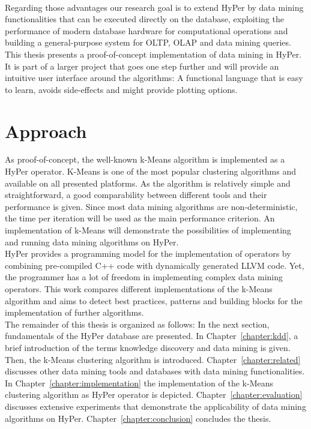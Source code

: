 \\
Regarding those advantages our research goal is to extend HyPer by data mining functionalities that can be executed directly on the database, exploiting the performance of modern database hardware for computational operations and building a general-purpose system for OLTP, OLAP and data mining queries. This thesis presents a proof-of-concept implementation of data mining in HyPer. It is part of a larger project that goes one step further and will provide an intuitive user interface around the algorithms: A functional language that is easy to learn, avoids side-effects and might provide plotting options. 


\section{Approach}
As proof-of-concept, the well-known k-Means algorithm is implemented as a HyPer operator. K-Means is one of the most popular  clustering algorithms and available on all presented platforms. As the algorithm is relatively simple and straightforward, a good comparability between different tools and their performance is given. Since most data mining algorithms are non-deterministic, the time per iteration will be used as the main performance criterion. An implementation of k-Means will demonstrate the possibilities of implementing and running data mining algorithms on HyPer.
\\
HyPer provides a programming model for the implementation of operators by combining pre-compiled C++ code with dynamically generated LLVM code. Yet, the programmer has a lot of freedom in implementing complex data mining operators. This work compares different implementations of the k-Means algorithm and aims to detect best practices, patterns and building blocks for the implementation of further algorithms.
\\
The remainder of this thesis is organized as follows: In the next section, fundamentals of the HyPer database are presented. In Chapter~\ref{chapter:kdd}, a brief introduction of the terms knowledge discovery and data mining is given. Then, the k-Means clustering algorithm is introduced. Chapter~\ref{chapter:related} discusses other data mining tools and databases with data mining functionalities. In Chapter~\ref{chapter:implementation} the implementation of the k-Means clustering algorithm as HyPer operator is depicted. Chapter~\ref{chapter:evaluation} discusses extensive experiments that demonstrate the applicability of data mining algorithms on HyPer. Chapter~\ref{chapter:conclusion} concludes the thesis.




